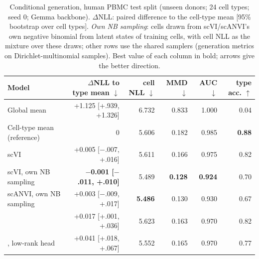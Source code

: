 \begin{table}[t]
\centering
\setlength{\tabcolsep}{4pt}
\begin{tabular}{lrrrrr}
\toprule
Model & $\Delta$NLL to type mean $\downarrow$ & cell NLL $\downarrow$ & MMD $\downarrow$ & AUC $\downarrow$ & type acc. $\uparrow$ \\
\midrule
Global mean & +1.125 [+.939, +1.326] & 6.732 & 0.833 & 1.000 & 0.04 \\
Cell-type mean (reference) & 0 & 5.606 & 0.182 & 0.985 & \textbf{0.88} \\
scVI & +0.005 [$-$.007, +.016] & 5.611 & 0.166 & 0.975 & 0.82 \\
scVI, own NB sampling & \textbf{$-$0.001 [$-$.011, +.010]} & 5.489 & \textbf{0.128} & \textbf{0.924} & 0.70 \\
scANVI, own NB sampling & +0.003 [$-$.009, +.017] & \textbf{5.486} & 0.130 & 0.930 & 0.67 \\
\rowcolor{ours}\cad{} & +0.017 [+.001, +.036] & 5.623 & 0.163 & 0.970 & 0.82 \\
\rowcolor{ours}\cad{}, low-rank head & +0.041 [+.018, +.067] & 5.552 & 0.165 & 0.970 & 0.77 \\
\bottomrule
\end{tabular}
\caption{Conditional generation, human PBMC test split (unseen donors; 24 cell types; seed 0; Gemma backbone). $\Delta$NLL: paired difference to the cell-type mean [95\% bootstrap over cell types]. \emph{Own NB sampling}: cells drawn from scVI/scANVI's own negative binomial from latent states of training cells, with cell NLL as the mixture over these draws; other rows use the shared samplers (generation metrics on Dirichlet-multinomial samples). Best value of each column in bold; arrows give the better direction.}
\label{tab:pbmc_main}
\end{table}
